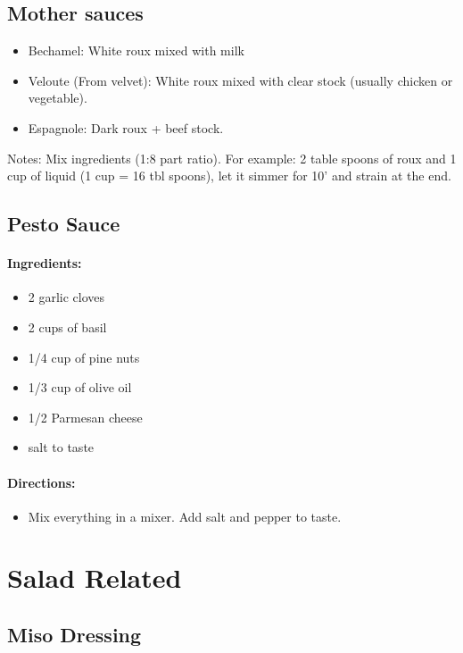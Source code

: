 \documentclass{article}
\begin{document}
\subsection{Mother sauces}
\begin{itemize}
	\item Bechamel: White roux mixed with milk
	\item Veloute (From velvet): White roux mixed with clear stock (usually chicken or vegetable).
	\item Espagnole: Dark roux + beef stock.
\end{itemize}

Notes: Mix ingredients (1:8 part ratio). For example: 2 table spoons of roux and 1 cup of liquid (1 cup = 16 tbl spoons), let it simmer for 10' and strain at the end.

\subsection{Pesto Sauce}

\paragraph{Ingredients:}

\begin{itemize}
	\item 2 garlic cloves
	\item 2 cups of basil
	\item 1/4 cup of pine nuts
	\item 1/3 cup of olive oil
	\item 1/2 Parmesan cheese
	\item salt to taste
\end{itemize}

\paragraph{Directions:}
\begin{itemize}
	\item Mix everything in a mixer. Add salt and pepper to taste.
\end{itemize}

\section{Salad Related}

\subsection{Miso Dressing}
\end{document}
